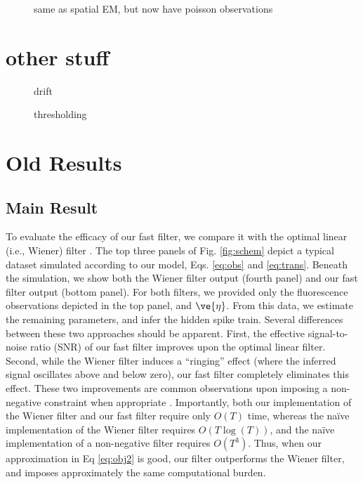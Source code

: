 \begin{figure}
\caption{same as spatial EM, but now have poisson observations} \label{fig:poisson}
\end{figure}

\section{other stuff}

\begin{figure}
\caption{drift}
\end{figure}

\begin{figure}
\caption{thresholding}
\end{figure}



\section{Old Results}
\subsection{Main Result}

To evaluate the efficacy of our fast filter, we compare it with the optimal linear (i.e., Wiener) filter \cite{Wiener49}. The top three panels of Fig. \ref{fig:schem} depict a typical dataset simulated according to our model, Eqs. \eqref{eq:obs} and \eqref{eq:trans}. Beneath the simulation, we show both the Wiener filter output (fourth panel) and our fast filter output (bottom panel).  For both filters, we provided only the fluorescence observations depicted in the top panel, and $\ve{\eta}$.  From this data, we estimate the remaining parameters, and infer the hidden spike train. Several differences between these two approaches should be apparent.  First, the effective signal-to-noise ratio (SNR) of our fast filter improves upon the optimal linear filter.  Second, while the Wiener filter induces a ``ringing'' effect (where the inferred signal oscillates above and below zero), our fast filter completely eliminates this effect.  These two improvements are common observations upon imposing a non-negative constraint when appropriate \cite{ShumwayStoffer06}.  Importantly, both our implementation of the Wiener filter and our fast filter require only $O(T)$ time, whereas the na\"{i}ve implementation of the Wiener filter requires $O(T \log(T))$, and the na\"{i}ve implementation of a non-negative filter requires $O(T^3)$.  Thus, when our approximation in Eq \eqref{eq:obj2} is good, our filter outperforms the Wiener filter, and imposes approximately the same computational burden.

